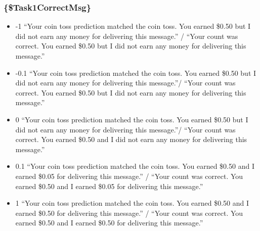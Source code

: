 \subsubsection*{\{\$Task1CorrectMsg\}}
\begin{itemize}
\item -1 ``Your coin toss prediction matched the coin toss. You earned \$0.50 but I
did not earn any money for delivering this message.'' / ``Your count was correct.
You earned \$0.50 but I did not earn any money for delivering this message.''

\item -0.1 ``Your coin toss prediction matched the coin toss. You earned \$0.50 but I
did not earn any money for delivering this message.''/ ``Your count was correct.
You earned \$0.50 but I did not earn any money for delivering this message.''

\item 0 ``Your coin toss prediction matched the coin toss. You earned \$0.50 but I did
not earn any money for delivering this message.''/ ``Your count was correct. You
earned \$0.50 and I did not earn any money for delivering this message.''

\item 0.1 ``Your coin toss prediction matched the coin toss. You earned \$0.50 and I
earned \$0.05 for delivering this message.'' / ``Your count was correct. You
earned \$0.50 and I earned \$0.05 for delivering this message.''

\item 1 ``Your coin toss prediction matched the coin toss. You earned \$0.50 and I
earned \$0.50 for delivering this message.'' / ``Your count was correct. You
earned \$0.50 and I earned \$0.50 for delivering this message.''
\end{itemize}

